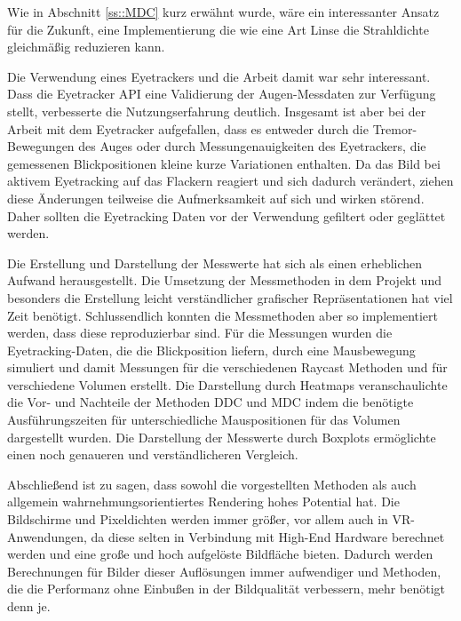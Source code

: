Wie in Abschnitt \ref{ss::MDC} kurz erwähnt wurde, wäre ein interessanter Ansatz für die Zukunft, eine Implementierung die wie eine Art Linse die Strahldichte gleichmäßig reduzieren kann.

Die Verwendung eines Eyetrackers und die Arbeit damit war sehr interessant.
Dass die Eyetracker API eine Validierung der Augen-Messdaten zur Verfügung stellt, verbesserte die Nutzungserfahrung deutlich. 
Insgesamt ist aber bei der Arbeit mit dem Eyetracker aufgefallen, dass es entweder durch die Tremor-Bewegungen des Auges oder durch Messungenauigkeiten des Eyetrackers, die gemessenen Blickpositionen kleine kurze Variationen enthalten. 
Da das Bild bei aktivem Eyetracking auf das Flackern reagiert und sich dadurch verändert, ziehen diese Änderungen teilweise die Aufmerksamkeit auf sich und wirken störend.
Daher sollten die Eyetracking Daten vor der Verwendung gefiltert oder geglättet werden.

Die Erstellung und Darstellung der Messwerte hat sich als einen erheblichen Aufwand herausgestellt.
Die Umsetzung der Messmethoden in dem Projekt und besonders die Erstellung leicht verständlicher grafischer Repräsentationen hat viel Zeit benötigt.
Schlussendlich konnten die Messmethoden aber so implementiert werden, dass diese reproduzierbar sind.
Für die Messungen wurden die Eyetracking-Daten, die die Blickposition liefern, durch eine Mausbewegung simuliert und damit Messungen für die verschiedenen Raycast Methoden und für verschiedene Volumen erstellt.
Die Darstellung durch Heatmaps veranschaulichte die Vor- und Nachteile der Methoden DDC und MDC indem die benötigte Ausführungszeiten für unterschiedliche Mauspositionen für das Volumen dargestellt wurden.
Die Darstellung der Messwerte durch Boxplots ermöglichte einen noch genaueren und verständlicheren Vergleich.

Abschließend ist zu sagen, dass sowohl die vorgestellten Methoden als auch allgemein wahrnehmungsorientiertes Rendering hohes Potential hat.
Die Bildschirme und Pixeldichten werden immer größer, vor allem auch in VR-Anwendungen, da diese selten in Verbindung mit High-End Hardware berechnet werden und eine große und hoch aufgelöste Bildfläche bieten.
Dadurch werden Berechnungen für Bilder dieser Auflösungen immer aufwendiger und Methoden, die die Performanz ohne Einbußen in der Bildqualität verbessern, mehr benötigt denn je.